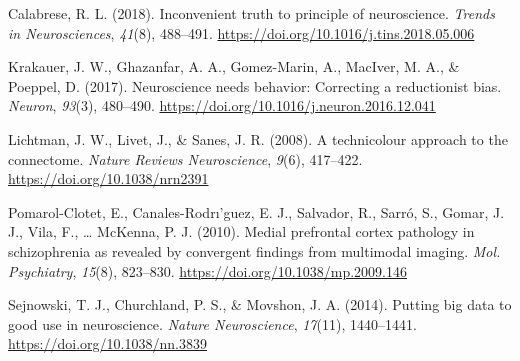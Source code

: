 \documentclass[]{article}
\begin{document}
\hypertarget{refs}{}
\leavevmode\hypertarget{ref-Calabrese2018-ve}{}%
Calabrese, R. L. (2018). Inconvenient truth to principle of
neuroscience. \emph{Trends in Neurosciences}, \emph{41}(8), 488--491.
\url{https://doi.org/10.1016/j.tins.2018.05.006}

\leavevmode\hypertarget{ref-Krakauer2017-xl}{}%
Krakauer, J. W., Ghazanfar, A. A., Gomez-Marin, A., MacIver, M. A., \&
Poeppel, D. (2017). Neuroscience needs behavior: Correcting a
reductionist bias. \emph{Neuron}, \emph{93}(3), 480--490.
\url{https://doi.org/10.1016/j.neuron.2016.12.041}

\leavevmode\hypertarget{ref-lichtman_technicolour_2008}{}%
Lichtman, J. W., Livet, J., \& Sanes, J. R. (2008). A technicolour
approach to the connectome. \emph{Nature Reviews Neuroscience},
\emph{9}(6), 417--422. \url{https://doi.org/10.1038/nrn2391}

\leavevmode\hypertarget{ref-Pomarol-Clotet2010-tq}{}%
Pomarol-Clotet, E., Canales-Rodrı'guez, E. J., Salvador, R., Sarró, S.,
Gomar, J. J., Vila, F., \ldots{} McKenna, P. J. (2010). Medial
prefrontal cortex pathology in schizophrenia as revealed by convergent
findings from multimodal imaging. \emph{Mol. Psychiatry}, \emph{15}(8),
823--830. \url{https://doi.org/10.1038/mp.2009.146}

\leavevmode\hypertarget{ref-sejnowski2014putting}{}%
Sejnowski, T. J., Churchland, P. S., \& Movshon, J. A. (2014). Putting
big data to good use in neuroscience. \emph{Nature Neuroscience},
\emph{17}(11), 1440--1441. \url{https://doi.org/10.1038/nn.3839}
\end{document}
